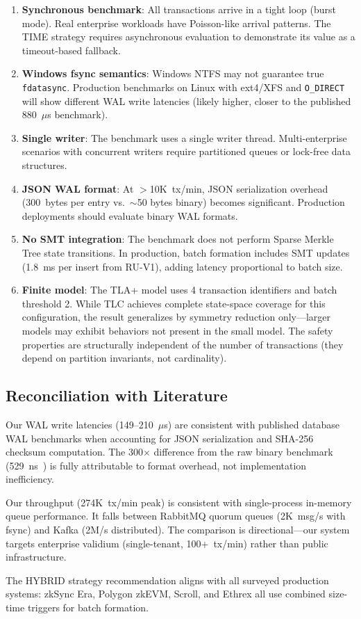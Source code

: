 \begin{enumerate}
\item \textbf{Synchronous benchmark}: All transactions arrive in a tight
  loop (burst mode). Real enterprise workloads have Poisson-like arrival
  patterns. The TIME strategy requires asynchronous evaluation to
  demonstrate its value as a timeout-based fallback.

\item \textbf{Windows fsync semantics}: Windows NTFS may not guarantee
  true \texttt{fdatasync}. Production benchmarks on Linux with ext4/XFS
  and \texttt{O\_DIRECT} will show different WAL write latencies (likely
  higher, closer to the published 880~$\mu$s benchmark).

\item \textbf{Single writer}: The benchmark uses a single writer thread.
  Multi-enterprise scenarios with concurrent writers require partitioned
  queues or lock-free data structures.

\item \textbf{JSON WAL format}: At $>$10K~tx/min, JSON serialization
  overhead (300~bytes per entry vs.\ $\sim$50 bytes binary) becomes
  significant. Production deployments should evaluate binary WAL formats.

\item \textbf{No SMT integration}: The benchmark does not perform Sparse
  Merkle Tree state transitions. In production, batch formation includes
  SMT updates (1.8~ms per insert from RU-V1), adding latency proportional
  to batch size.

\item \textbf{Finite model}: The TLA+ model uses 4 transaction identifiers
  and batch threshold 2. While TLC achieves complete state-space coverage
  for this configuration, the result generalizes by symmetry reduction
  only---larger models may exhibit behaviors not present in the small model.
  The safety properties are structurally independent of the number of
  transactions (they depend on partition invariants, not cardinality).
\end{enumerate}

\subsection{Reconciliation with Literature}

Our WAL write latencies (149--210~$\mu$s) are consistent with published
database WAL benchmarks when accounting for JSON serialization and SHA-256
checksum computation. The 300$\times$ difference from the raw binary
benchmark (529~ns~\cite{chia2024database}) is fully attributable to format
overhead, not implementation inefficiency.

Our throughput (274K~tx/min peak) is consistent with single-process
in-memory queue performance. It falls between RabbitMQ quorum queues
(2K~msg/s with fsync) and Kafka (2M/s distributed). The comparison is
directional---our system targets enterprise validium (single-tenant,
100+~tx/min) rather than public infrastructure.

The HYBRID strategy recommendation aligns with all surveyed production
systems: zkSync Era, Polygon zkEVM, Scroll, and Ethrex all use combined
size-time triggers for batch formation.
